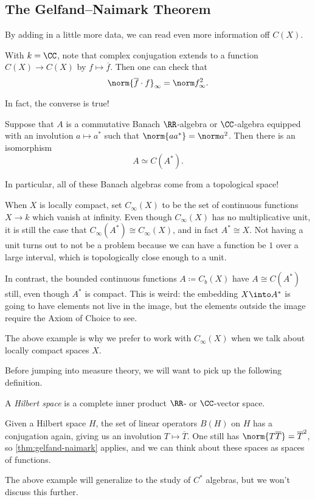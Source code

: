 \documentclass[../notes.tex]{subfiles}
\begin{document}
\subsection{The Gelfand--Naimark Theorem}
By adding in a little more data, we can read even more information off $C(X)$.
\begin{remark}
	With $k=\CC$, note that complex conjugation extends to a function $C(X)\to C(X)$ by $f\mapsto\overline f$. Then one can check that
	\[\norm{\overline f\cdot f}_\infty=\norm f_\infty^2.\]
\end{remark}
In fact, the converse is true!
\begin{theorem} \label{thm:gelfand-naimark}
	Suppose that $A$ is a commutative Banach $\RR$-algebra or $\CC$-algebra equipped with an involution $a\mapsto a^*$ such that $\norm{aa^*}=\norm a^2$. Then there is an isomorphism
	\[A\simeq C(A^*).\]
\end{theorem}
In particular, all of these Banach algebras come from a topological space!
\begin{example}
	When $X$ is locally compact, set $C_\infty(X)$ to be the set of continuous functions $X\to k$ which vanish at infinity. Even though $C_\infty(X)$ has no multiplicative unit, it is still the case that $C_\infty(A^*)\cong C_\infty(X)$, and in fact $A^*\cong X$. Not having a unit turns out to not be a problem because we can have a function be $1$ over a large interval, which is topologically close enough to a unit.
\end{example}
\begin{example}
	In contrast, the bounded continuous functions $A\coloneqq C_b(X)$ have $A\cong C(A^*)$ still, even though $A^*$ is compact. This is weird: the embedding $X\into A^*$ is going to have elements not live in the image, but the elements outside the image require the Axiom of Choice to see.
\end{example}
The above example is why we prefer to work with $C_\infty(X)$ when we talk about locally compact spaces $X$.

Before jumping into measure theory, we will want to pick up the following definition.
\begin{definition}
	A \textit{Hilbert space} is a complete inner product $\RR$- or $\CC$-vector space.
\end{definition}
\begin{example}
	Given a Hilbert space $H$, the set of linear operators $B(H)$ on $H$ has a conjugation again, giving us an involution $T\mapsto \overline T$. One still has $\norm{T\overline T}=\overline T^2$, so \autoref{thm:gelfand-naimark} applies, and we can think about these spaces as spaces of functions.
\end{example}
The above example will generalize to the study of $C^*$ algebras, but we won't discuss this further.
\end{document}
